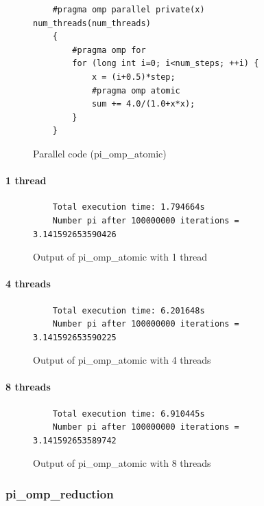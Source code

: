\documentclass[12pt, a4paper]{article}
\begin{document}
\begin{figure}[H]
	\begin{lstlisting}
	#pragma omp parallel private(x) num_threads(num_threads)
    {
        #pragma omp for 
        for (long int i=0; i<num_steps; ++i) {
            x = (i+0.5)*step;
            #pragma omp atomic 
	    	sum += 4.0/(1.0+x*x);
        }
    }
	\end{lstlisting}
	
	\caption{Parallel code (pi\_omp\_atomic)}
\end{figure}

\paragraph{1 thread}

\begin{figure}[H]
	\begin{lstlisting}
	Total execution time: 1.794664s
	Number pi after 100000000 iterations = 3.141592653590426		
	\end{lstlisting}
	\caption{Output of pi\_omp\_atomic with 1 thread}
\end{figure}

\paragraph{4 threads}

\begin{figure}[H]
	\begin{lstlisting}
	Total execution time: 6.201648s
	Number pi after 100000000 iterations = 3.141592653590225			
	\end{lstlisting}
	\caption{Output of pi\_omp\_atomic with 4 threads}
\end{figure}

\paragraph{8 threads}

\begin{figure}[H]
	\begin{lstlisting}
	Total execution time: 6.910445s
	Number pi after 100000000 iterations = 3.141592653589742
	\end{lstlisting}
	\caption{Output of pi\_omp\_atomic with 8 threads}
\end{figure}

\subsubsection{pi\_omp\_reduction}
\end{document}
